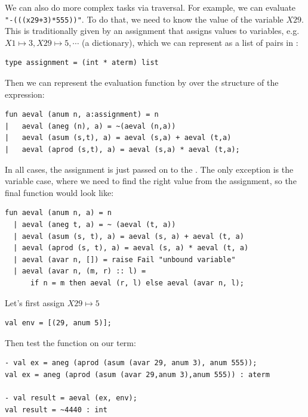 We can also do more complex tasks via  traversal. For example, we can evaluate \texttt{"-(((x29+3)*555))"}. To do that, we need to know the value of the variable $X29$. This is traditionally given by an assignment that assigns values to variables, e.g. $X1 \mapsto 3, X29 \mapsto 5, \cdots$ (a dictionary), which we can represent as a list of pairs in :
\begin{verbatim}
type assignment = (int * aterm) list
\end{verbatim}
Then we can represent the evaluation function by  over the structure of the expression:
\begin{verbatim}
fun aeval (anum n, a:assignment) = n
|   aeval (aneg (n), a) = ~(aeval (n,a))
|   aeval (asum (s,t), a) = aeval (s,a) + aeval (t,a)
|   aeval (aprod (s,t), a) = aeval (s,a) * aeval (t,a);
\end{verbatim}
In all cases, the assignment is just passed on to the . The only exception is the variable case, where we need to  find the right value from the assignment, so the final function would look like:
\begin{verbatim}
fun aeval (anum n, a) = n
  | aeval (aneg t, a) = ~ (aeval (t, a))
  | aeval (asum (s, t), a) = aeval (s, a) + aeval (t, a)
  | aeval (aprod (s, t), a) = aeval (s, a) * aeval (t, a)
  | aeval (avar n, []) = raise Fail "unbound variable"
  | aeval (avar n, (m, r) :: l) =
      if n = m then aeval (r, l) else aeval (avar n, l);
\end{verbatim}

Let's first assign $X29 \mapsto 5$
\begin{verbatim}
val env = [(29, anum 5)];
\end{verbatim}
Then test the function on our term:
\begin{verbatim}
- val ex = aneg (aprod (asum (avar 29, anum 3), anum 555));
val ex = aneg (aprod (asum (avar 29,anum 3),anum 555)) : aterm

- val result = aeval (ex, env);
val result = ~4440 : int
\end{verbatim}


